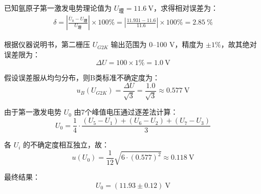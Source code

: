 \documentclass[]{../template/Report}%
\begin{document}
\begin{fullreportonly}
已知氩原子第一激发电势理论值为 $U_{\text{理}} = \SI{11.6}{\volt}$，求得相对误差为：
\begin{align*}
\delta = \left| \frac{\bar{U}_0 - U_{\text{理}}}{U_{\text{理}}} \right| \times 100\% = \left| \frac{11.931 - 11.6}{11.6} \right| \times 100\%= \SI{2.85}{\percent}
\end{align*}

根据仪器说明书，第二栅压 $U_{G2K}$ 输出范围为 0--100 V，精度为 $\pm 1\%$，故其绝对误差限为：
\[
\Delta U = 100 \times 1\% = \SI{1.0}{\volt}
\]

假设误差服从均匀分布，则B类标准不确定度为：
\[
u_B(U_{G2K}) = \frac{\Delta U}{\sqrt{3}} = \frac{1.0}{\sqrt{3}} \approx \SI{0.577}{\volt}
\]

由于第一激发电势 $U_0$ 由7个峰值电压通过逐差法计算：
\[
U_0 = \frac{1}{4} \cdot \frac{(U_5 - U_1) + (U_6 - U_2) + (U_7 - U_3)}{3}
\]

各 $U_i$ 的不确定度相互独立，故：
\[
u(U_0) = \frac{1}{12} \sqrt{6 \cdot (0.577)^2} \approx \SI{0.118}{\volt}
\]

最终结果：
\[
\boxed{U_0 = (\num{11.93} \pm \num{0.12})~\mathrm{V}}
\]


\end{fullreportonly}
\end{document}
